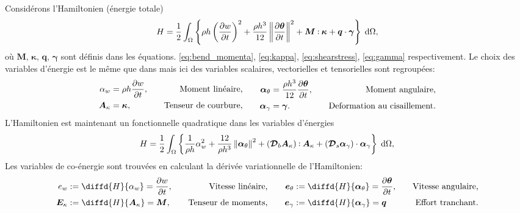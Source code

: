 Considérons l'Hamiltonien (énergie totale)
\begin{equation}
H = \frac{1}{2} \int_{\Omega}  \left\{ \rho h \left(\diffp{w}{t} \right)^2 + \frac{\rho h^3}{12} \norm{\diffp{\bm{\theta}}{t}}^2 +   \bm{M} \cddot \bm{\kappa} + \bm{q} \cdot \bm{\gamma}  \right\}  \d\Omega, 
\end{equation}
où $\bm{M}, \, \bm{\kappa}, \, \bm{q}, \, \bm{\gamma}$ sont définis dans les équations. \eqref {eq:bend_momenta}, \eqref{eq:kappa}, \eqref{eq:shearstress}, \eqref{eq:gamma} respectivement. Le choix des variables d'énergie est le même que dans \cite{macchelli2005mindlin} mais ici des variables scalaires, vectorielles et tensorielles sont regroupées:
\begin{equation}
\begin{aligned}
\alpha_w &= \rho h \diffp{w}{t}, \quad &\text{Moment linéaire,} \\
\bm{A}_{\kappa} &= \bm{\kappa}, \quad &\text{Tenseur de courbure,} \\
\end{aligned} \qquad
\begin{aligned}
\bm\alpha_{\theta} &=  \frac{\rho h^3}{12} \diffp{\bm{\theta}}{t}, \quad &\text{Moment angulaire,}\\
\bm\alpha_{\gamma} &= \bm{\gamma}. \quad &\text{Deformation au cisaillement.}\\
\end{aligned}
\end{equation}
L'Hamiltonien est maintenant un fonctionnelle quadratique dans les variables d'énergies
\begin{equation}
H = \frac{1}{2} \int_{\Omega}  \left\{ \frac{1}{\rho h}\alpha_w^2 + \frac{12}{\rho h^3} \norm{\bm{\alpha}_{\theta}}^2 + (\bm{\mathcal{D}}_b \bm{A}_\kappa) \cddot \bm{A}_\kappa + (\bm{\mathcal{D}}_s \bm{\alpha}_\gamma) \cdot  \bm{\alpha}_\gamma  \right\}  \d\Omega, 
\end{equation}
Les variables de co-énergie sont trouvées en calculant la dérivée variationnelle de l'Hamiltonien:
\begin{equation}
\begin{aligned}
e_w &:= \diffd{H}{\alpha_w} = \diffp{w}{t},  \quad &\text{Vitesse linéaire,} \\
\bm{E}_{\kappa} &:= \diffd{H}{\bm{A}_{\kappa}} = \bm{M}, \quad &\text{Tenseur de moments,}\\
\end{aligned} \qquad
\begin{aligned}
\bm{e}_{\theta} &:= \diffd{H}{\bm\alpha_{\theta}} = \diffp{\bm{\theta}}{t}, \quad &\text{Vitesse angulaire,}  \\
\bm{e}_{\gamma} &:= \diffd{H}{\bm\alpha_{\gamma}} = \bm{q} \quad &\text{Effort tranchant.} \\
\end{aligned}
\end{equation}
